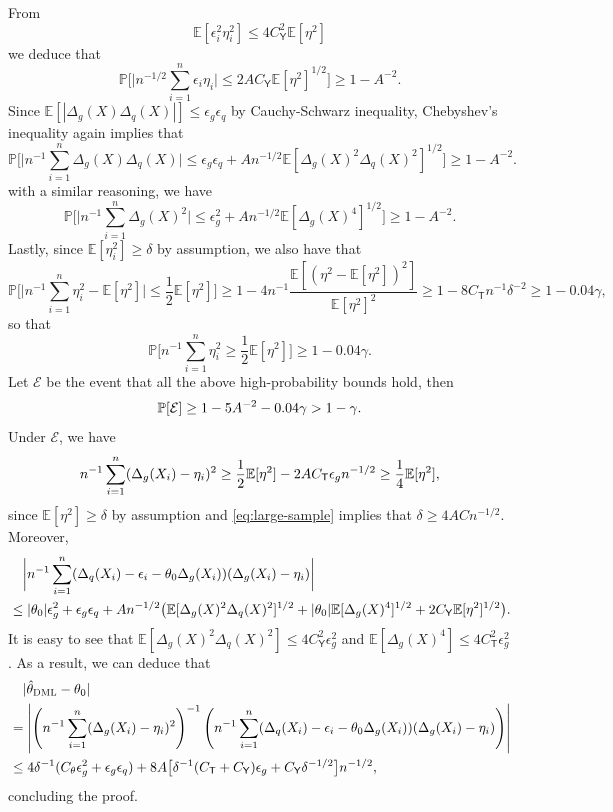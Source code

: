 \documentclass{article}
\def\eps{{\epsilon}}
\def\gE{{\mathcal{E}}}
\newcommand{\E}{\mathbb{E}}
\newcommand{\dml}{\textsc{DML}}
\begin{document}
From
$$\E[\eps_i^2\eta_i^2] \leq 4C_{\mathsf{Y}}^2\E[\eta^2]$$
we deduce that
$$\mathbb{P}\bigg[\big|n^{-1/2}\sum_{i=1}^n \eps_i\eta_i\big|\leq 2AC_{\mathsf{Y}}\E[\eta^2]^{1/2}\bigg] \geq 1- A^{-2}.$$
Since $\E[|\Delta_g(X)\Delta_q(X)|] \leq \eps_g\eps_q$ by Cauchy-Schwarz inequality, Chebyshev's inequality again implies that
$$\mathbb{P}\bigg[\big|n^{-1}\sum_{i=1}^n \Delta_g(X)\Delta_q(X)\big|\leq \eps_g\eps_q + An^{-1/2}\E[\Delta_g(X)^2\Delta_q(X)^2]^{1/2} \bigg] \geq 1- A^{-2}.$$
with a similar reasoning, we have
$$\mathbb{P}\bigg[\big|n^{-1}\sum_{i=1}^n \Delta_g(X)^2\big|\leq \eps_g^2+An^{-1/2}\E[\Delta_g(X)^4]^{1/2}\bigg] \geq 1- A^{-2}.$$
Lastly, since $\E[\eta_i^2]\geq\delta$ by assumption, we also have that
$$\mathbb{P}\bigg[\big|n^{-1}\sum_{i=1}^n\eta_i^2 - \E[\eta^2]\big|\leq \frac{1}{2}\E[\eta^2]\bigg] \geq 1-4n^{-1}\frac{\E[(\eta^2-\E[\eta^2])^2]}{\E[\eta^2]^2} \geq 1-8C_{\mathsf{T}}n^{-1}\delta^{-2} \geq 1-0.04\gamma,$$
so that
$$\mathbb{P}\bigg[n^{-1}\sum_{i=1}^n\eta_i^2 \geq \frac{1}{2}\E[\eta^2] \bigg] \geq 1-0.04\gamma.$$
Let $\gE$ be the event that all the above high-probability bounds hold, then
\begin{equation}
    \notag
    \mathbb{P}[\gE] \geq 1-5A^{-2}-0.04\gamma > 1-\gamma.
\end{equation}
Under $\gE$, we have
\begin{equation}
    \notag
    n^{-1}\sum_{i=1}^n(\Delta_g(X_i)-\eta_i)^2 \geq \frac{1}{2}\E[\eta^2] - 2AC_{\mathsf{T}}\eps_gn^{-1/2} \geq \frac{1}{4}\E[\eta^2],
\end{equation}
since $\E[\eta^2]\geq\delta$ by assumption and \eqref{eq:large-sample} implies that $\delta\geq 4ACn^{-1/2}$. Moreover, 
\begin{equation}
    \notag
    \begin{aligned}
        &\quad \bigg|n^{-1}\sum_{i=1}^n (\Delta_q(X_i)-\eps_i-\theta_0\Delta_g(X_i)) (\Delta_g(X_i)-\eta_i)\bigg| \\
        &\leq |\theta_0|\eps_g^2+\eps_g\eps_q + An^{-1/2}\big(\E[\Delta_g(X)^2\Delta_q(X)^2]^{1/2} + |\theta_0|\E[\Delta_g(X)^4]^{1/2} + 2C_{\mathsf{Y}}\E[\eta^2]^{1/2} \big).
    \end{aligned}
\end{equation}
It is easy to see that $\E[\Delta_g(X)^2\Delta_q(X)^2] \leq 4C_{\mathsf{Y}}^2\eps_g^2$ and $\E[\Delta_g(X)^4]\leq 4C_{\mathsf{T}}^2\eps_g^2$. As a result, we can deduce that
\begin{equation}
    \notag
    \begin{aligned}
        &\quad |\hat{\theta}_{\dml} - \theta_0| \\
        &= \left|\left(n^{-1}\sum_{i=1}^n(\Delta_g(X_i)-\eta_i)^2\right)^{-1}\left(n^{-1}\sum_{i=1}^n (\Delta_q(X_i)-\eps_i-\theta_0\Delta_g(X_i)) (\Delta_g(X_i)-\eta_i)\right)\right| \\
        &\leq 4\delta^{-1}(C_{\theta}\eps_g^2+\eps_g\eps_q) + 8A\big[\delta^{-1}(C_{\mathsf{T}}+C_{\mathsf{Y}})\eps_g + C_{\mathsf{Y}}\delta^{-1/2} \big] n^{-1/2},
    \end{aligned}
\end{equation}
concluding the proof.
\end{document}
